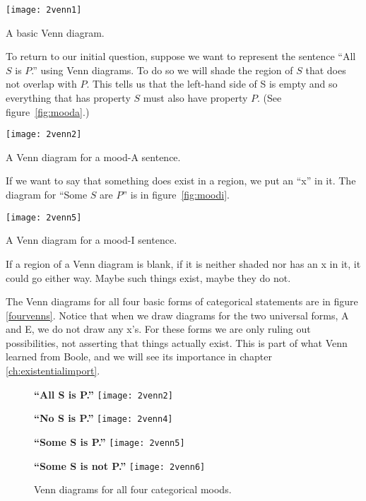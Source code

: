 \begin{marginfigure}
\texttt{[image: 2venn1]}
\caption{A basic Venn diagram.}
\label{fig:basicvenn}
\end{marginfigure}

To return to our initial question, suppose we want to represent the sentence ``All $S$ is $P$.'' using Venn diagrams. To do so we will shade the region of $S$ that does not overlap with $P$. This tells us that the left-hand side of S is empty and so everything that has property $S$ must also have property $P$. (See figure~\ref{fig:mooda}.)

\begin{marginfigure}
\texttt{[image: 2venn2]}
\caption{A Venn diagram for a mood-A sentence.}
\label{fig:mooda}
\end{marginfigure}

If we want to say that something does exist in a region, we put an ``x'' in it. The diagram for ``Some $S$ are $P$'' is in figure~\ref{fig:moodi}.

\begin{marginfigure}
\texttt{[image: 2venn5]}
\caption{A Venn diagram for a mood-I sentence.}
\label{fig:moodi}
\end{marginfigure}


If a region of a Venn diagram is blank, if it is neither shaded nor has an x in it, it could go either way. Maybe such things exist, maybe they do not.

The Venn diagrams for all four basic forms of categorical statements are in figure \ref{fourvenns}. Notice that when we draw diagrams for the two universal forms, A and E, we do not draw any x's. For these forms we are only ruling out possibilities, not asserting that things actually exist. This is part of what Venn learned from Boole, and we will see its importance in chapter \ref{ch:existentialimport}.

\begin{figure}[!ht]
\begin{minipage}[t]{0.4\textwidth}\centering
    \textbf{``All S is P.''}
\texttt{[image: 2venn2]}
\end{minipage}\hspace{1cm}
\begin{minipage}[t]{0.4\textwidth}\centering
    \textbf{``No S is P.''}
\texttt{[image: 2venn4]}
\end{minipage}

\vspace{1cm}

\begin{minipage}[t]{0.4\textwidth}\centering
    \textbf{``Some S is P.''}
\texttt{[image: 2venn5]}
\end{minipage}\hspace{1cm}
\begin{minipage}[t]{0.4\textwidth}\centering
    \textbf{``Some S is not P.''}
\texttt{[image: 2venn6]}
\end{minipage}

\vspace{1cm}

\caption{Venn diagrams for all four categorical moods.}
\label{fig:fourvenns}
\end{figure}


